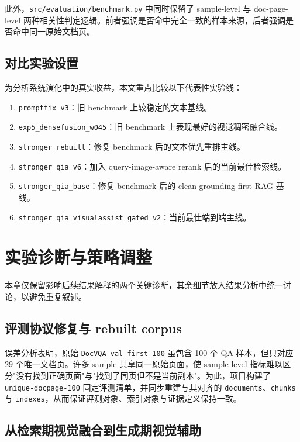 \documentclass{SYSUReport}
\begin{document}
此外，\texttt{src/evaluation/benchmark.py} 中同时保留了 sample-level 与 doc-page-level 两种相关性判定逻辑。前者强调是否命中完全一致的样本来源，后者强调是否命中同一原始文档页。

\subsection{对比实验设置}

为分析系统演化中的真实收益，本文重点比较以下代表性实验线：

\begin{enumerate}
    \item \texttt{promptfix\_v3}：旧 benchmark 上较稳定的文本基线。
    \item \texttt{exp5\_densefusion\_w045}：旧 benchmark 上表现最好的视觉稠密融合线。
    \item \texttt{stronger\_rebuilt}：修复 benchmark 后的文本优先重排主线。
    \item \texttt{stronger\_qia\_v6}：加入 query-image-aware rerank 后的当前最佳检索线。
    \item \texttt{stronger\_qia\_base}：修复 benchmark 后的 clean grounding-first RAG 基线。
    \item \texttt{stronger\_qia\_visualassist\_gated\_v2}：当前最佳端到端主线。
\end{enumerate}

\section{实验诊断与策略调整}

本章仅保留影响后续结果解释的两个关键诊断，其余细节放入结果分析中统一讨论，以避免重复叙述。

\subsection{评测协议修复与 rebuilt corpus}

误差分析表明，原始 \texttt{DocVQA val first-100} 虽包含 100 个 QA 样本，但只对应 29 个唯一文档页。许多 sample 共享同一原始页面，使 sample-level 指标难以区分"没有找到正确页面"与"找到了同页但不是当前副本"。为此，项目构建了 \texttt{unique-docpage-100} 固定评测清单，并同步重建与其对齐的 \texttt{documents}、\texttt{chunks} 与 \texttt{indexes}，从而保证评测对象、索引对象与证据定义保持一致。

\subsection{从检索期视觉融合到生成期视觉辅助}
\end{document}
